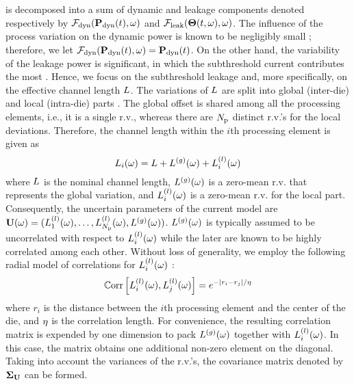  is decomposed into a sum of dynamic and leakage components denoted respectively by $\mathcal{F}_{\text{dyn}}(\mathbf{P}_{\text{dyn}}(t), \omega)$ and $\mathcal{F}_{\text{leak}}({\boldsymbol\Theta}(t, \omega), \omega)$. The influence of the process variation on the dynamic power is known to be negligibly small \cite{juan2011, juan2012, srivastava2010}; therefore, we let $\mathcal{F}_{\text{dyn}}(\mathbf{P}_{\text{dyn}}(t), \omega) = \mathbf{P}_{\text{dyn}}(t)$. On the other hand, the variability of the leakage power is significant, in which the subthreshold current contributes the most \cite{juan2011, juan2012}. Hence, we focus on the subthreshold leakage and, more specifically, on the effective channel length $L$. The variations of $L$ are split into global (inter-die) and local (intra-die) parts \cite{juan2011, juan2012, shen2009, srivastava2010}. The global offset is shared among all the processing elements, i.e., it is a single r.v., whereas there are ${N_\text{p}}$ distinct r.v.'s for the local deviations. Therefore, the channel length within the $i$th processing element is given as
\[
  L_i(\omega) = L + {L^{(g)}}(\omega) + L^{(l)}_i(\omega)
\]
where $L$ is the nominal channel length, ${L^{(g)}}(\omega)$ is a zero-mean r.v. that represents the global variation, and $L^{(l)}_i(\omega)$ is a zero-mean r.v. for the local part. Consequently, the uncertain parameters of the current model are $\mathbf{U}(\omega) = (L^{(l)}_1(\omega), \dotsc, L^{(l)}_{N_\text{p}}(\omega), {L^{(g)}}(\omega) )$. ${L^{(g)}}(\omega)$ is typically assumed to be uncorrelated with respect to $L^{(l)}_i(\omega)$ while the later are known to be highly correlated among each other. Without loss of generality, we employ the following radial model of correlations for $L^{(l)}_i(\omega)$ \cite{ghanem1991, cheng2011}:
\begin{equation} \elabel{correlation-matrix}
  \oCorr{\lLeff_i(\o), \lLeff_j(\o)} = e^{-|r_i - r_j|/\corrLength}
\end{equation}
where $r_i$ is the distance between the $i$th processing element and the center of the die, and $\eta$ is the correlation length. For convenience, the resulting correlation matrix is expended by one dimension to pack ${L^{(g)}}(\omega)$ together with $L^{(l)}_i(\omega)$. In this case, the matrix obtains one additional non-zero element on the diagonal. Taking into account the variances of the r.v.'s, the covariance matrix denoted by $\mCov_\vU$ can be formed.


